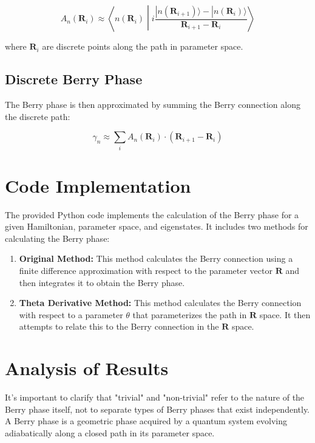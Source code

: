 \documentclass{article}
\begin{document}
$$
A_n(\mathbf{R}_i) \approx \left\langle n(\mathbf{R}_i) \middle| i \frac{|n(\mathbf{R}_{i+1})\rangle - |n(\mathbf{R}_i)\rangle}{\mathbf{R}_{i+1} - \mathbf{R}_i} \right\rangle
$$

where $\mathbf{R}_i$ are discrete points along the path in parameter space.

\subsection{Discrete Berry Phase}

The Berry phase is then approximated by summing the Berry connection along the discrete path:

$$
\gamma_n \approx \sum_i A_n(\mathbf{R}_i) \cdot (\mathbf{R}_{i+1} - \mathbf{R}_i)
$$

\section{Code Implementation}

The provided Python code implements the calculation of the Berry phase for a given Hamiltonian, parameter space, and eigenstates. It includes two methods for calculating the Berry phase:

\begin{enumerate}
    \item  \textbf{Original Method:} This method calculates the Berry connection using a finite difference approximation with respect to the parameter vector $\mathbf{R}$ and then integrates it to obtain the Berry phase.
    \item  \textbf{Theta Derivative Method:} This method calculates the Berry connection with respect to a parameter $\theta$ that parameterizes the path in $\mathbf{R}$ space. It then attempts to relate this to the Berry connection in the $\mathbf{R}$ space.
\end{enumerate}

\section{Analysis of Results}

It's important to clarify that "trivial" and "non-trivial" refer to the nature of the Berry phase itself, not to separate types of Berry phases that exist independently. A Berry phase is a geometric phase acquired by a quantum system evolving adiabatically along a closed path in its parameter space. \cite{berry1984}
\end{document}
